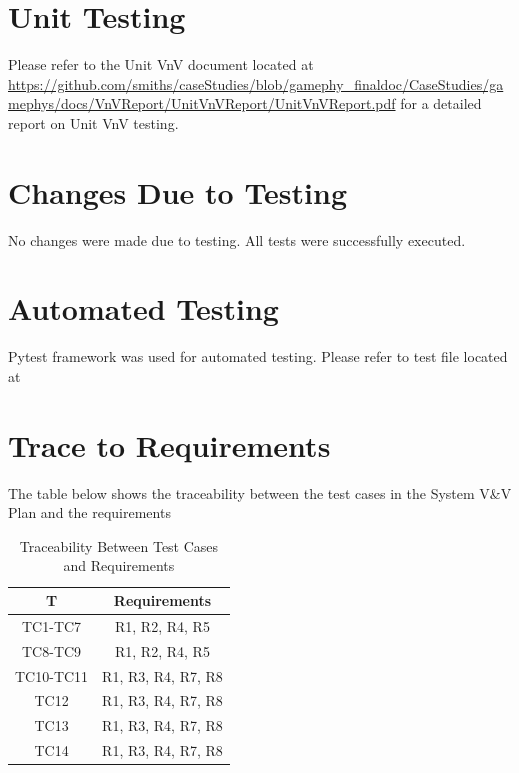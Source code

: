 \documentclass[12pt, titlepage]{article}
\begin{document}
\section{Unit Testing}
Please refer to the Unit VnV document located at \url{https://github.com/smiths/caseStudies/blob/gamephy_finaldoc/CaseStudies/gamephys/docs/VnVReport/UnitVnVReport/UnitVnVReport.pdf} for a detailed report on Unit VnV testing.

\section{Changes Due to Testing}
No changes were made due to testing. All tests were successfully executed.

\section{Automated Testing}
Pytest framework was used for automated testing. Please refer to test file located at 
		
\section{Trace to Requirements}
The table below shows the traceability between the test cases in 
the System V\&V Plan and the requirements

\begin{table} [h!]
	
	\centering
	
	\begin{tabular}{|c|c|}
		
		\hline	
		
		\textbf{T} & \textbf{Requirements}\\
		
		\hline 
		
		TC1-TC7& R1, R2, R4, R5\\ \hline 
		TC8-TC9& R1, R2, R4, R5\\ \hline
		TC10-TC11& R1, R3, R4, R7, R8\\ \hline
		TC12& R1, R3, R4, R7, R8\\ \hline
		TC13& R1, R3, R4, R7, R8\\ \hline
		TC14& R1, R3, R4, R7, R8\\ \hline
	\end{tabular}
	
	\caption{Traceability Between Test Cases and Requirements}
	
	\label{Table:Traceability} 
	
\end{table}
 ~\newpage		
\end{document}
